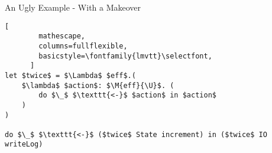 
\begin{frame}[fragile]{An Ugly Example - With a Makeover}

    \begin{lstlisting}[
        mathescape,
        columns=fullflexible,
        basicstyle=\fontfamily{lmvtt}\selectfont,
      ]
let $twice$ = $\Lambda$ $eff$.(
    $\lambda$ $action$: $\M{eff}{\U}$. (
        do $\_$ $\texttt{<-}$ $action$ in $action$
    )
)

do $\_$ $\texttt{<-}$ ($twice$ State increment) in ($twice$ IO writeLog)
    \end{lstlisting}
\end{frame}